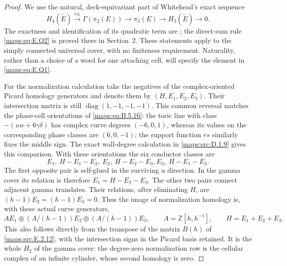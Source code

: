 \begin{proof}
We use the natural, deck-equivariant part of Whitehead's exact
sequence
\[
 H_4(\widetilde E)\xrightarrow{\omega_E}\Gamma(\pi_2(E))
       \longrightarrow\pi_3(E)\longrightarrow
 H_3(\widetilde E)\longrightarrow0.
 \tag{E.Q3}\label{maps:eq:E.Q3}
\]
The exactness and identification of its quadratic term are
\cite[Theorems 1 and 5]{mapsWhitehead50}; the direct-sum rule
\eqref{maps:eq:E.Q2} is proved there in Section~2.  These statements apply
to the simply connected universal cover, with no finiteness
requirement.  Naturality, rather than a choice of a word for
one attaching cell, will specify the element in \eqref{maps:eq:E.Q1}.

For the normalization calculation take the negatives of
the complex-oriented Picard homology generators and denote
them by $(H,E_1,E_2,E_3)$.  Their intersection matrix is
still $\operatorname{diag}(1,-1,-1,-1)$.  This common reversal
matches the phase-cell orientations of \eqref{maps:eq:B.5.16}: the toric
line with class $-(uw+6\gamma\delta)$ has complex curve
degrees $(-6,0,1)$, whereas its values on the corresponding
phase classes are $(6,0,-1)$; the support function $rs$
similarly fixes the middle sign.  The exact wall-degree
calculation in \ref{maps:src:D.1.9} gives this comparison.  With these
orientations the six conductor classes are
\[
 E_1,\ H-E_1-E_2,\ E_2,\ H-E_2-E_3,
                                      E_3,\ H-E_1-E_3.
\]
The first opposite pair is self-glued in the surviving $u$
direction.  In the gamma cover its relation is therefore
$E_1=H-E_2-E_3$.  The other two pairs connect adjacent gamma
translates.  Their relations, after eliminating $H$, are
$(h-1)E_2=(h-1)E_3=0$.  Thus the image of normalization
homology is, with these actual curve generators,
\[
 A E_1\oplus(A/(h-1))E_2\oplus(A/(h-1))E_3,
 \qquad A=\mathbb Z[h,h^{-1}],\qquad H=E_1+E_2+E_3.
 \tag{E.Q4}\label{maps:eq:E.Q4}
\]
This also follows directly from the transpose of the matrix
$B(h)$ of \ref{maps:src:E.2.12}, with the intersection signs in the Picard
basis retained.  It is the whole $H_2$ of the gamma cover:
the degree-zero normalization row is the cellular complex
of an infinite cylinder, whose second homology is zero.


\end{proof}
